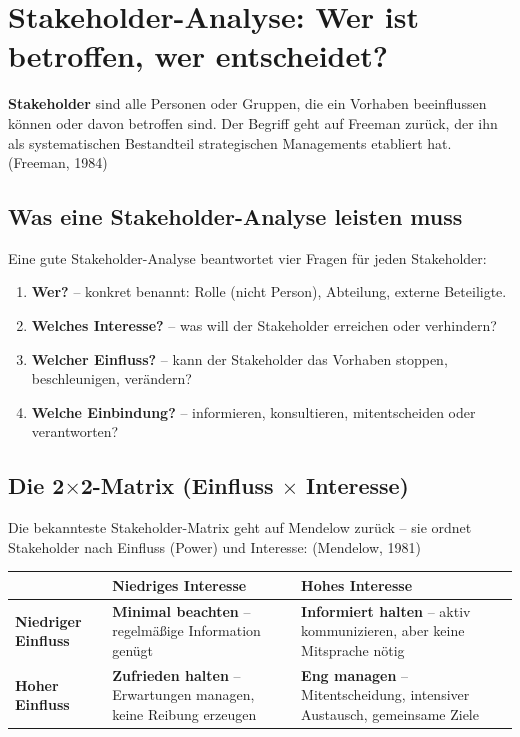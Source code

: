 \documentclass[11pt,a4paper,oneside]{article}
\newcommand{\fachbegriff}[1]{\textbf{#1}}
\newcommand{\quelle}[1]{{\footnotesize\color{lpGray}(#1)}}
\begin{document}
\section{Stakeholder-Analyse: Wer ist betroffen, wer entscheidet?}

\fachbegriff{Stakeholder} sind alle Personen oder Gruppen, die ein Vorhaben beeinflussen können oder davon betroffen sind. Der Begriff geht auf Freeman zurück, der ihn als systematischen Bestandteil strategischen Managements etabliert hat. \quelle{Freeman, 1984}

\subsection{Was eine Stakeholder-Analyse leisten muss}

Eine gute Stakeholder-Analyse beantwortet vier Fragen für jeden Stakeholder:

\begin{enumerate}
  \item \textbf{Wer?} -- konkret benannt: Rolle (nicht Person), Abteilung, externe Beteiligte.
  \item \textbf{Welches Interesse?} -- was will der Stakeholder erreichen oder verhindern?
  \item \textbf{Welcher Einfluss?} -- kann der Stakeholder das Vorhaben stoppen, beschleunigen, verändern?
  \item \textbf{Welche Einbindung?} -- informieren, konsultieren, mitentscheiden oder verantworten?
\end{enumerate}

\subsection{Die 2$\times$2-Matrix (Einfluss $\times$ Interesse)}

Die bekannteste Stakeholder-Matrix geht auf Mendelow zurück -- sie ordnet Stakeholder nach Einfluss (Power) und Interesse: \quelle{Mendelow, 1981}

\begin{tabularx}{\linewidth}{@{}>{\bfseries}lXX@{}}
\toprule
       & \textbf{Niedriges Interesse} & \textbf{Hohes Interesse} \\
\midrule
Niedriger Einfluss & \textbf{Minimal beachten} -- regelmäßige Information genügt & \textbf{Informiert halten} -- aktiv kommunizieren, aber keine Mitsprache nötig \\
Hoher Einfluss & \textbf{Zufrieden halten} -- Erwartungen managen, keine Reibung erzeugen & \textbf{Eng managen} -- Mitentscheidung, intensiver Austausch, gemeinsame Ziele \\
\bottomrule
\end{tabularx}
\end{document}
